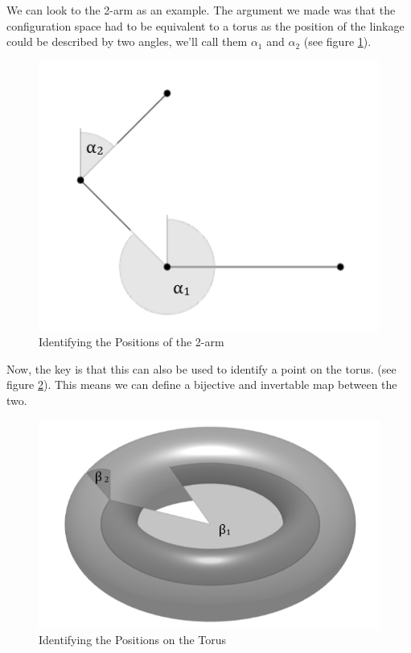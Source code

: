 \documentclass{article}
\begin{document}
We can look to the 2-arm as an example. The argument we made was that the configuration space had to be equivalent to a torus as the position of the linkage could be described by two angles, we'll call them $\alpha_1$ and $\alpha_2$ (see figure \ref{fig:2-arm Labeled Angles}).

\begin{figure}[h!]
\centering
\includegraphics[scale=0.4]{./images/2_arm_labeled_angles.png}
\caption{Identifying the Positions of the 2-arm}
\label{fig:2-arm Labeled Angles}
\end{figure}

\noindent Now, the key is that this can also be used to identify a point on the torus. (see figure \ref{fig:Torus Labeled Angles}). This means we can define a bijective and invertable map between the two.

\begin{figure}[h!]
\centering
\includegraphics[scale=0.4]{./images/torus_labeled_angles.png}
\caption{Identifying the Positions on the Torus}
\label{fig:Torus Labeled Angles}
\end{figure}
\end{document}
